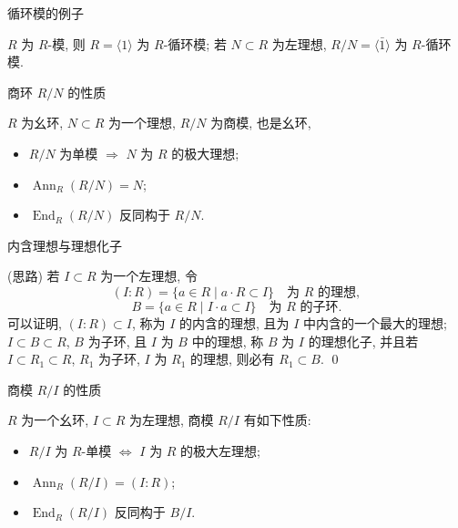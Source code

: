 
\begin{frame}{循环模的例子}

\begin{eg}[循环模的例子]
$R$ 为 $R$-模, 则 $R = \langle 1 \rangle$ 为 $R$-循环模;
若 $N \subset R$ 为左理想, $R/N = \langle \bar{1} \rangle$ 为 $R$-循环模.
\end{eg}

\end{frame}


\begin{frame}{商环 $R/N$ 的性质}

\begin{eg}[商环 $R/N$ 的性质]
$R$ 为幺环, $N \subset R$ 为一个理想, $R/N$ 为商模, 也是幺环,
\begin{itemize}
\item[(i)] $R/N$ 为单模 $\Longrightarrow$ $N$ 为 $R$ 的极大理想;
\item[(ii)] $\operatorname{Ann}_R(R/N) = N$;
\item[(iii)] $\operatorname{End}_R(R/N)$ 反同构于 $R/N$.
\end{itemize}
\end{eg}

\end{frame}


\begin{frame}{内含理想与理想化子}

\startproof[bg=yellow, fg=red](思路)
若 $I \subset R$ 为一个左理想, 令
\[
(I:R) = \{ a \in R \mid a \cdot R \subset I \}
\quad \text{为 } R \text{ 的理想},
\]
\[
B = \{ a \in R \mid I \cdot a \subset I \}
\quad \text{为 } R \text{ 的子环}.
\]
可以证明, $(I:R) \subset I$, 称为 $I$ 的内含的理想, 且为 $I$ 中内含的一个最大的理想;
$I \subset B \subset R$, $B$ 为子环, 且 $I$ 为 $B$ 中的理想, 称 $B$ 为 $I$
的理想化子, 并且若 $I \subset R_1 \subset R$, $R_1$ 为子环, $I$ 为 $R_1$
的理想, 则必有 $R_1 \subset B$.
\qed

\end{frame}


\begin{frame}{商模 $R/I$ 的性质}

\begin{eg}[商模 $R/I$ 的性质]
$R$ 为一个幺环, $I \subset R$ 为左理想, 商模 $R/I$ 有如下性质:
\begin{itemize}
\item[(i)] $R/I$ 为 $R$-单模 $\iff$ $I$ 为 $R$ 的极大左理想;
\item[(ii)] $\operatorname{Ann}_R(R/I) = (I:R)$;
\item[(iii)] $\operatorname{End}_R(R/I)$ 反同构于 $B/I$.
\end{itemize}
\end{eg}

\end{frame}

